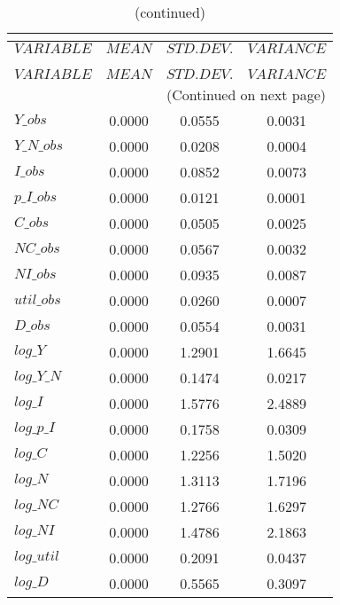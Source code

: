 
\begin{center}
\begin{longtable}{lccc} 
\caption{THEORETICAL MOMENTS}\\
 \label{Table:th_moments}\\
\toprule 
$VARIABLE   $	 & 	 $         MEAN$	 & 	 $    STD. DEV.$	 & 	 $     VARIANCE$\\
\midrule \endfirsthead 
\caption{(continued)}\\
 \toprule \\ 
$VARIABLE   $	 & 	 $         MEAN$	 & 	 $    STD. DEV.$	 & 	 $     VARIANCE$\\
\midrule \endhead 
\midrule \multicolumn{4}{r}{(Continued on next page)} \\ \bottomrule \endfoot 
\bottomrule \endlastfoot 
$Y\_obs     $	 & 	       0.0000	 & 	       0.0555	 & 	       0.0031 \\ 
$Y\_N\_obs  $	 & 	       0.0000	 & 	       0.0208	 & 	       0.0004 \\ 
$I\_obs     $	 & 	       0.0000	 & 	       0.0852	 & 	       0.0073 \\ 
$p\_I\_obs  $	 & 	       0.0000	 & 	       0.0121	 & 	       0.0001 \\ 
$C\_obs     $	 & 	       0.0000	 & 	       0.0505	 & 	       0.0025 \\ 
$NC\_obs    $	 & 	       0.0000	 & 	       0.0567	 & 	       0.0032 \\ 
$NI\_obs    $	 & 	       0.0000	 & 	       0.0935	 & 	       0.0087 \\ 
$util\_obs  $	 & 	       0.0000	 & 	       0.0260	 & 	       0.0007 \\ 
$D\_obs     $	 & 	       0.0000	 & 	       0.0554	 & 	       0.0031 \\ 
$log\_Y     $	 & 	       0.0000	 & 	       1.2901	 & 	       1.6645 \\ 
$log\_Y\_N  $	 & 	       0.0000	 & 	       0.1474	 & 	       0.0217 \\ 
$log\_I     $	 & 	       0.0000	 & 	       1.5776	 & 	       2.4889 \\ 
$log\_p\_I  $	 & 	       0.0000	 & 	       0.1758	 & 	       0.0309 \\ 
$log\_C     $	 & 	       0.0000	 & 	       1.2256	 & 	       1.5020 \\ 
$log\_N     $	 & 	       0.0000	 & 	       1.3113	 & 	       1.7196 \\ 
$log\_NC    $	 & 	       0.0000	 & 	       1.2766	 & 	       1.6297 \\ 
$log\_NI    $	 & 	       0.0000	 & 	       1.4786	 & 	       2.1863 \\ 
$log\_util  $	 & 	       0.0000	 & 	       0.2091	 & 	       0.0437 \\ 
$log\_D     $	 & 	       0.0000	 & 	       0.5565	 & 	       0.3097 \\ 
\end{longtable}
 \end{center}
